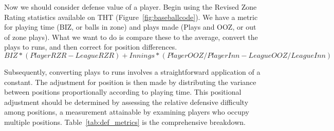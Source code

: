 \documentclass[12pt]{article}
\begin{document}
\begin{table}[ht]
  \caption{Park value formula and its per plate appearance in each team}
  \label{tab:PF_PFPA} 
  \centering
  \cite*{web:Wyers:Part3}
\end{table}



Now we should consider defense value of a player. Begin using the Revised Zone Rating statistics \citep*{web:Studeman2007Field} 
available on THT (Figure~\ref*{fig:baseballcode}). We have a metric for playing time 
(BIZ, or balls in zone) and plays made (Plays and OOZ, or out of zone plays). What we want to 
do is compare these to the average, convert the plays to runs, and then correct for position differences.
\begin{equation}
  \label{eq:RZR}
  BIZ * (PlayerRZR - LeagueRZR) + Innings * (PlayerOOZ/PlayerInn - LeagueOOZ/LeagueInn)
\end{equation}

Subsequently, converting plays to runs involves a straightforward application of a constant. The adjustment
for position is then made by distributing the variance between positions proportionally according to playing 
time. This positional adjustment should be determined by assessing the relative defensive difficulty among 
positions, a measurement attainable by examining players who occupy multiple positions. Table~\ref*{tab:def_metrics}
is the comprehensive breakdown.
\end{document}
